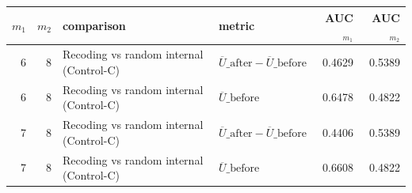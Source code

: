 \begingroup
{}
\small
\setlength{\tabcolsep}{6pt}
\renewcommand{\arraystretch}{1.15}
\setlength{\LTleft}{0pt}
\setlength{\LTright}{0pt}
\begin{longtable}{r r l l r r}
\toprule
$m_1$ & $m_2$ & comparison & metric & AUC$_{m_1}$ & AUC$_{m_2}$ \\
\midrule
6 & 8 & Recoding vs random internal (Control-C) & $\overline{U}\_{\mathrm{after}}-\overline{U}\_{\mathrm{before}}$ & 0.4629 & 0.5389 \\
6 & 8 & Recoding vs random internal (Control-C) & $\overline{U}\_{\mathrm{before}}$ & 0.6478 & 0.4822 \\
7 & 8 & Recoding vs random internal (Control-C) & $\overline{U}\_{\mathrm{after}}-\overline{U}\_{\mathrm{before}}$ & 0.4406 & 0.5389 \\
7 & 8 & Recoding vs random internal (Control-C) & $\overline{U}\_{\mathrm{before}}$ & 0.6608 & 0.4822 \\
\bottomrule
\end{longtable}
\endgroup


